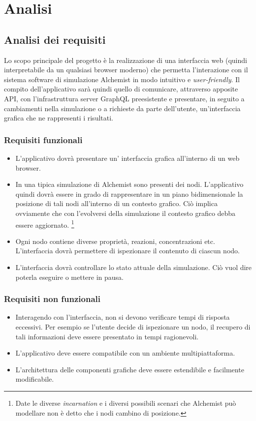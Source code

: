 \chapter{Analisi}

\section{Analisi dei requisiti}
Lo scopo principale del progetto è la realizzazione di una interfaccia web (quindi interpretabile da un qualsiasi browser moderno) che permetta l'interazione con il sistema software di simulazione
Alchemist in modo intuitivo e \textit{user-friendly}. Il compito dell'applicativo sarà quindi quello di comunicare, attraverso apposite \ac{API}, con l'infrastruttura server GraphQL preesistente e presentare, in seguito a cambiamenti nella simulazione o a richieste da parte dell'utente, un'interfaccia grafica che ne rappresenti i risultati.
\subsection{Requisiti funzionali}
\begin{itemize}
	\item L'applicativo dovrà presentare un' interfaccia grafica all'interno di un web browser.
	\item In una tipica simulazione di Alchemist sono presenti dei nodi. L'applicativo quindi dovrà essere in grado di rappresentare in un piano bidimensionale la posizione di tali nodi all'interno di un contesto grafico. Ciò implica ovviamente che con l'evolversi della simulazione il contesto grafico debba essere aggiornato. \footnote{Date le diverse \textit{incarnation} e i diversi possibili scenari che Alchemist può modellare non è detto che i nodi cambino di posizione.}
	\item Ogni nodo contiene diverse proprietà, reazioni, concentrazioni etc. L'interfaccia dovrà permettere di ispezionare il contenuto di ciascun nodo. 
	\item L'interfaccia dovrà controllare lo stato attuale della simulazione. Ciò vuol dire poterla eseguire o mettere in pausa.
\end{itemize}

\subsection{Requisiti non funzionali}
\begin{itemize}
	\item Interagendo con l'interfaccia, non si devono verificare tempi di risposta eccessivi. Per esempio se l'utente decide di ispezionare un nodo, il recupero di tali informazioni deve essere presentato in tempi ragionevoli.
	\item L'applicativo deve essere compatibile con un ambiente multipiattaforma.
	\item L'architettura delle componenti grafiche deve essere estendibile e facilmente modificabile.
\end{itemize}

